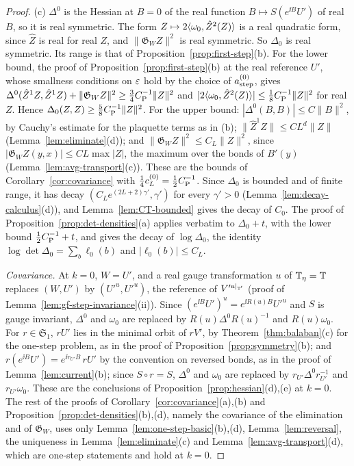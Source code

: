 \begin{proof}
(c) $\Delta^0$ is the Hessian at $B=0$ of the real function $B\mapsto S(e^{\ii B}U')$ of real $B$, so it is real symmetric. The form $Z\mapsto2\langle \omega_0,\hat Z^2(Z)\rangle$ is a real quadratic form, since $\hat Z$ is real for real $Z$, and $\|\mathfrak G_WZ\|^2$ is real symmetric. So $\Delta_0$ is real symmetric. Its range is that of Proposition~\ref{prop:first-step}(b). For the lower bound, the proof of Proposition~\ref{prop:first-step}(b) at the real reference $U'$, whose smallness conditions on $\varepsilon$ hold by the choice of $a^{(0)}_{\rm step}$, gives $\Delta^0(\hat Z^1Z,\hat Z^1Z)+\|\mathfrak G_WZ\|^2\ge\frac34C_{\rm P}^{-1}\|Z\|^2$ and $|2\langle \omega_0,\hat Z^2(Z)\rangle|\le\frac18C_{\rm P}^{-1}\|Z\|^2$ for real $Z$. Hence $\Delta_0(Z,Z)\ge\frac58C_{\rm P}^{-1}\|Z\|^2$. For the upper bound: $|\Delta^0(B,B)|\le C\|B\|^2$, by Cauchy's estimate for the plaquette terms as in (b); $\|\hat Z^1Z\|\le CL^d\|Z\|$ (Lemma~\ref{lem:eliminate}(d)); and $\|\mathfrak G_WZ\|^2\le C_L\|Z\|^2$, since $|\mathfrak G_WZ(y,x)|\le CL\max|Z|$, the maximum over the bonds of $B'(y)$ (Lemma~\ref{lem:avg-transport}(c)). These are the bounds of Corollary~\ref{cor:covariance} with $\frac14c^{(0)}_L=\frac12C_{\rm P}^{-1}$. Since $\Delta_0$ is bounded and of finite range, it has decay $(C_Le^{(2L+2)\gamma'},\gamma')$ for every $\gamma'>0$ (Lemma~\ref{lem:decay-calculus}(d)), and Lemma~\ref{lem:CT-bounded} gives the decay of $C_0$. The proof of Proposition~\ref{prop:det-densities}(a) applies verbatim to $\Delta_0+t$, with the lower bound $\frac12C_{\rm P}^{-1}+t$, and gives the decay of $\log\Delta_0$, the identity $\log\det\Delta_0=\sum_b\ell_0(b)$ and $|\ell_0(b)|\le C_L$.

\emph{Covariance.} At $k=0$, $W=U'$, and a real gauge transformation $u$ of $\mathbb T_\eta=\mathbb T$ replaces $(W,U')$ by $(U'^u,U'^u)$, the reference of $V'^{u|_{\mathbb T'}}$ (proof of Lemma~\ref{lem:gf-step-invariance}(ii)). Since $(e^{\ii B}U')^u=e^{\ii R(u)B}U'^u$ and $S$ is gauge invariant, $\Delta^0$ and $\omega_0$ are replaced by $R(u)\Delta^0R(u)^{-1}$ and $R(u)\omega_0$. For $r\in\mathfrak S_1$, $rU'$ lies in the minimal orbit of $rV'$, by Theorem~\ref{thm:balaban}(c) for the one-step problem, as in the proof of Proposition~\ref{prop:symmetry}(b); and $r(e^{\ii B}U')=e^{\ii r_{U'}B}\,rU'$ by the convention on reversed bonds, as in the proof of Lemma~\ref{lem:current}(b); since $S\circ r=S$, $\Delta^0$ and $\omega_0$ are replaced by $r_{U'}\Delta^0r_{U'}^{-1}$ and $r_{U'}\omega_0$. These are the conclusions of Proposition~\ref{prop:hessian}(d),(e) at $k=0$. The rest of the proofs of Corollary~\ref{cor:covariance}(a),(b) and Proposition~\ref{prop:det-densities}(b),(d), namely the covariance of the elimination and of $\mathfrak G_W$, uses only Lemma~\ref{lem:one-step-basic}(b),(d), Lemma~\ref{lem:reversal}, the uniqueness in Lemma~\ref{lem:eliminate}(c) and Lemma~\ref{lem:avg-transport}(d), which are one-step statements and hold at $k=0$.


\end{proof}

